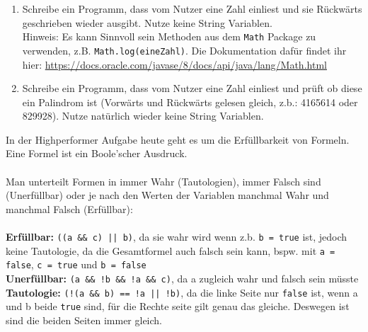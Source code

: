 \documentclass{../../sheet}
\begin{document}
\begin{enumerate}
    \item Schreibe ein Programm, dass vom Nutzer eine Zahl einliest und sie Rückwärts geschrieben wieder ausgibt. Nutze keine String Variablen.\\
    Hinweis: Es kann Sinnvoll sein Methoden aus dem \texttt{Math} Package zu verwenden, z.B. \texttt{Math.log(eineZahl)}. Die Dokumentation dafür findet ihr hier: \url{https://docs.oracle.com/javase/8/docs/api/java/lang/Math.html}
    \item Schreibe ein Programm, dass vom Nutzer eine Zahl einliest und prüft ob diese ein Palindrom ist (Vorwärts und Rückwärts gelesen gleich, z.b.: 4165614 oder 829928). Nutze natürlich wieder keine String Variablen.
\end{enumerate}

\newpage
{}
In der Highperformer Aufgabe heute geht es um die Erfüllbarkeit von Formeln. Eine Formel ist ein Boole'scher Ausdruck. 
\\\\
Man unterteilt Formen in immer Wahr (Tautologien), immer Falsch sind (Unerfüllbar) oder je nach den Werten der Variablen manchmal Wahr und manchmal Falsch (Erfüllbar):
\\\\
\textbf{Erfüllbar: } \texttt{((a \&\& c) || b)}, da sie wahr wird wenn z.b. \texttt{b = true} ist, jedoch keine Tautologie, da die Gesamtformel auch falsch sein kann, bspw. mit \texttt{a = false}, \texttt{c = true} und \texttt{b = false}\\
\textbf{Unerfüllbar: } \texttt{(a \&\& !b \&\& !a \&\& c)}, da a zugleich wahr und falsch sein müsste\\
\textbf{Tautologie: } \texttt{(!(a \&\& b) == !a || !b)}, da die linke Seite nur \texttt{false} ist, wenn a und b beide \texttt{true} sind, für die Rechte seite gilt genau das gleiche. Deswegen ist sind die beiden Seiten immer gleich.
\end{document}
